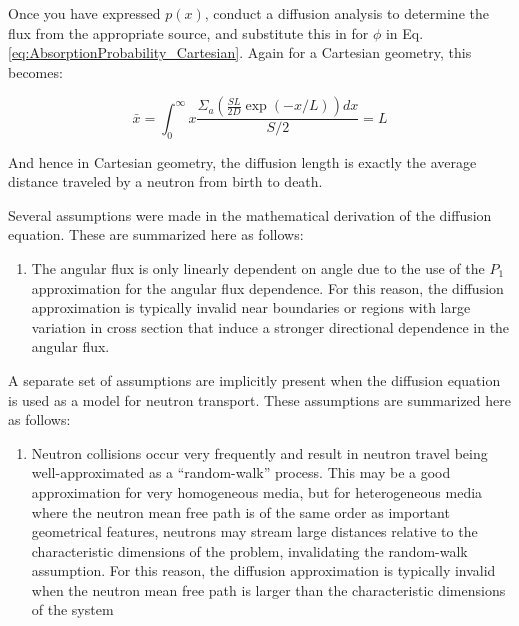 Once you have expressed \(p(x)\), conduct a diffusion analysis to determine the flux from the appropriate source, and substitute this in for \(\phi\) in Eq. \ref{eq:AbsorptionProbability_Cartesian}. Again for a Cartesian geometry, this becomes:

\begin{equation}
\label{AverageDistance_Cartesian}
\bar{x}=\int_{0}^{\infty}x\frac{\Sigma_a\left(\frac{SL}{2D}\exp(-x/L)\right)dx}{S/2}=L
\end{equation}

And hence in Cartesian geometry, the diffusion length is exactly the average distance traveled by a neutron from birth to death.


Several assumptions were made in the mathematical derivation of the diffusion equation. These are summarized here as follows:

\begin{enumerate}
\item The angular flux is only linearly dependent on angle due to the use of the \(P_1\) approximation for the angular flux dependence. For this reason, the diffusion approximation is typically invalid near boundaries or regions with large variation in cross section that induce a stronger directional dependence in the angular flux.
\end{enumerate}

A separate set of assumptions are implicitly present when the diffusion equation is used as a model for neutron transport. These assumptions are summarized here as follows:

\begin{enumerate}
\item Neutron collisions occur very frequently and result in neutron travel being well-approximated as a ``random-walk'' process. This may be a good approximation for very homogeneous media, but for heterogeneous media where the neutron mean free path is of the same order as important geometrical features, neutrons may stream large distances relative to the characteristic dimensions of the problem, invalidating the random-walk assumption. For this reason, the diffusion approximation is typically invalid when the neutron mean free path is larger than the characteristic dimensions of the system %
\end{enumerate}